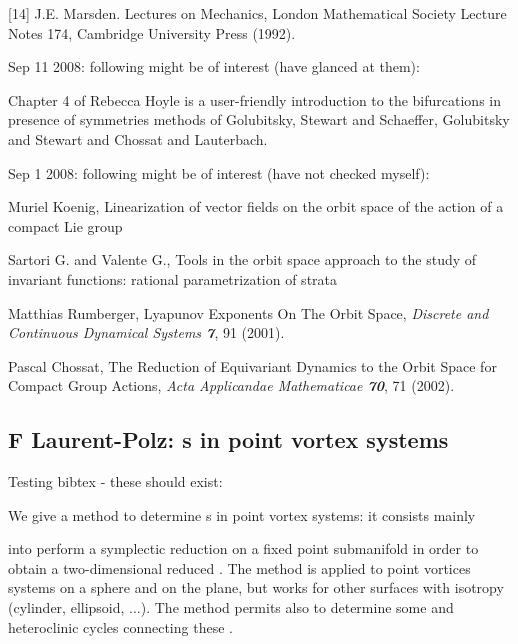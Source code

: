 [14] J.E. Marsden. Lectures on Mechanics, London Mathematical Society Lecture Notes 174,
Cambridge University Press (1992).

\medskip{} Sep 11 2008:
following might be of interest (have glanced at them):


Chapter 4 of Rebecca Hoyle is a user-friendly introduction
to the bifurcations in presence of symmetries methods of
Golubitsky, Stewart and Schaeffer,
Golubitsky and Stewart and
Chossat and Lauterbach.

\medskip{} Sep 1 2008:
following might be of interest (have not checked myself):

Muriel Koenig,
{Linearization of vector fields on the orbit space of the action of a compact Lie group}

Sartori G. and Valente G.,
{Tools in the orbit space approach to the study of invariant functions:
 rational parametrization of strata}

Matthias Rumberger,
{Lyapunov Exponents On The Orbit Space},
{\em Discrete and Continuous Dynamical Systems \bf 7}, 91 (2001). %

Pascal Chossat,
{The Reduction of Equivariant Dynamics to
 the Orbit Space for Compact Group Actions},
{\em Acta Applicandae Mathematicae \bf 70}, 71 (2002). %



\subsection{F Laurent-Polz: {\Rpo s} in point vortex systems}

Testing bibtex - these should exist:

We give a method to determine {\rpo s} in point vortex systems: it consists mainly

into perform a symplectic reduction on a fixed point submanifold in order to obtain
a two-dimensional reduced \statesp. The method is applied to point vortices systems
on a sphere and on the plane, but works for other surfaces with isotropy
(cylinder, ellipsoid, ...). The method permits also to determine some
{\reqva} and heteroclinic cycles connecting these {\reqva}.

